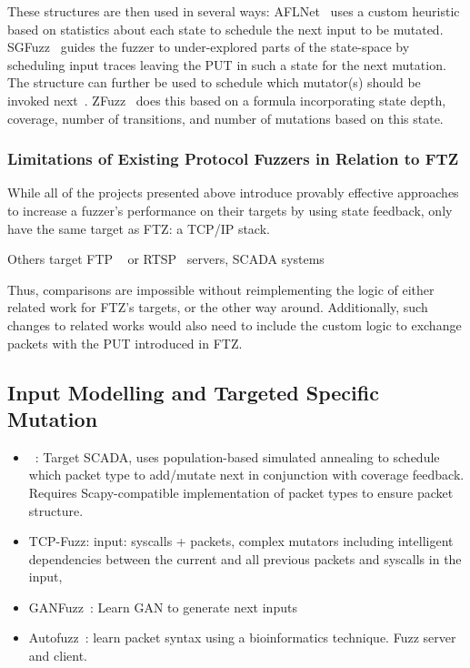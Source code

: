 \documentclass{article}
\newcommand{\proj}{FTZ\xspace}
\let\savedCite=\cite
\renewcommand{\cite}{\unskip~\savedCite}
\begin{document}
\begin{multicols}{2}
  These structures are then used in several ways: AFLNet\cite{AFLNET} uses a custom heuristic based on statistics about each state to schedule the next input to be mutated. SGFuzz\cite{SGFuzz} guides the fuzzer to under-explored parts of the state-space by scheduling input traces leaving the PUT in such a state for the next mutation. The structure can further be used to schedule which mutator(s) should be invoked next\cite{ModelBased}. ZFuzz\cite{ZFuzz} does this based on a formula incorporating state depth, coverage, number of transitions, and number of mutations based on this state.

  \subsubsection{Limitations of Existing Protocol Fuzzers in Relation to \proj}

  While all of the projects presented above introduce provably effective approaches to increase a fuzzer's performance on their targets by using state feedback, only  have the same target as \proj: a TCP/IP stack.

  Others target FTP \cite{AFLNET} or RTSP\cite{AFLNET} servers, SCADA systems\cite{EPF}

  Thus, comparisons are impossible without reimplementing the logic of either related work for \proj's targets, or the other way around. Additionally, such changes to related works would also need to include the custom logic to exchange packets with the PUT introduced in \proj.

  \subsection{Input Modelling and Targeted Specific Mutation}

  \begin{itemize}
    \item {}\cite{EPF}: Target SCADA, uses population-based simulated annealing to schedule which packet type to add/mutate next in conjunction with coverage feedback. Requires Scapy-compatible implementation of packet types to ensure packet structure.
    \item TCP-Fuzz: input: syscalls + packets, complex mutators including intelligent dependencies between the current and all previous packets and syscalls in the input,
    \item GANFuzz\cite{GANFuzz}: Learn GAN to generate next inputs
    \item     Autofuzz\cite{Autofuzz}: learn packet syntax using a bioinformatics technique. Fuzz server and client.



\end{itemize}
\end{multicols}
\end{document}
